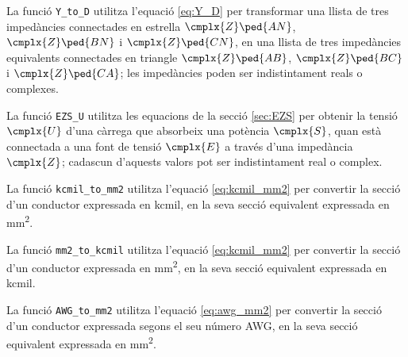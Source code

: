 La funció \texttt{Y\_to\_D} utilitza l'equació \eqref{eq:Y_D} per transformar una llista de tres impedàncies connectades en estrella $\cmplx{Z}\ped{AN}$, $\cmplx{Z}\ped{BN}$ i $\cmplx{Z}\ped{CN}$, en una llista de tres impedàncies equivalents connectades en triangle $\cmplx{Z}\ped{AB}$, $\cmplx{Z}\ped{BC}$ i  $\cmplx{Z}\ped{CA}$; les impedàncies poden ser indistintament reals o complexes.




La funció \texttt{EZS\_U} utilitza les equacions de la secció \vref{sec:EZS} per obtenir la tensió $\cmplx{U}$ d'una càrrega que absorbeix una potència $\cmplx{S}$, quan està connectada a una font de tensió $\cmplx{E}$ a través d'una impedància $\cmplx{Z}$; cadascun d'aquests valors pot ser indistintament real o complex.




La funció \texttt{kcmil\_to\_mm2} utilitza l'equació \eqref{eq:kcmil_mm2} per convertir la secció d'un conductor expressada en \unit{kcmil}, en la seva secció equivalent expressada en \unit{mm^2}.




La funció \texttt{mm2\_to\_kcmil} utilitza l'equació \eqref{eq:kcmil_mm2} per convertir la secció d'un conductor expressada en \unit{mm^2}, en la seva secció equivalent expressada en \unit{kcmil}.




La funció \texttt{AWG\_to\_mm2} utilitza l'equació \eqref{eq:awg_mm2} per convertir la secció d'un conductor expressada segons el seu número AWG, en la seva secció equivalent expressada en \unit{mm^2}.




